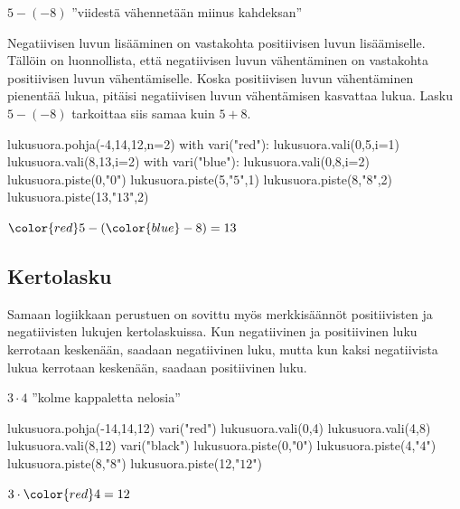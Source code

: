     
    $5-(-8)$ ''viidestä vähennetään miinus kahdeksan''
    
    Negatiivisen luvun lisääminen on vastakohta positiivisen luvun lisäämiselle. Tällöin on luonnollista, että negatiivisen luvun vähentäminen on vastakohta positiivisen luvun vähentämiselle. Koska positiivisen luvun vähentäminen pienentää lukua, pitäisi negatiivisen luvun vähentämisen kasvattaa lukua. Lasku $5-(-8)$ tarkoittaa siis samaa kuin $5+8$.
\vspace{0.3cm}     
        
\begin{center}
\begin{kuva}
	lukusuora.pohja(-4,14,12,n=2)
	with vari("red"):
		lukusuora.vali(0,5,i=1)
		lukusuora.vali(8,13,i=2)
	with vari("blue"): lukusuora.vali(0,8,i=2)
	lukusuora.piste(0,"$0$")
	lukusuora.piste(5,"$5$",1)
	lukusuora.piste(8,"$8$",2)
	lukusuora.piste(13,"$13$",2)
\end{kuva}
       ${\color{red}5}-({\color{blue}-8})=13$
\end{center}


%



\subsection*{Kertolasku}

    Samaan logiikkaan perustuen on sovittu myös merkkisäännöt positiivisten ja negatiivisten lukujen kertolaskuissa. Kun negatiivinen ja positiivinen luku kerrotaan keskenään, saadaan negatiivinen luku, mutta kun kaksi negatiivista lukua kerrotaan keskenään, saadaan positiivinen luku.

    $3 \cdot 4$ ''kolme kappaletta nelosia''
    
\begin{center}
\begin{kuva}
	lukusuora.pohja(-14,14,12)
	vari("red")
	lukusuora.vali(0,4)
	lukusuora.vali(4,8)
	lukusuora.vali(8,12)
	vari("black")
	lukusuora.piste(0,"$0$")
	lukusuora.piste(4,"$4$")
	lukusuora.piste(8,"$8$")
	lukusuora.piste(12,"$12$")
\end{kuva}
%
      $3\cdot {\color{red}4}=12$
\end{center}
    
